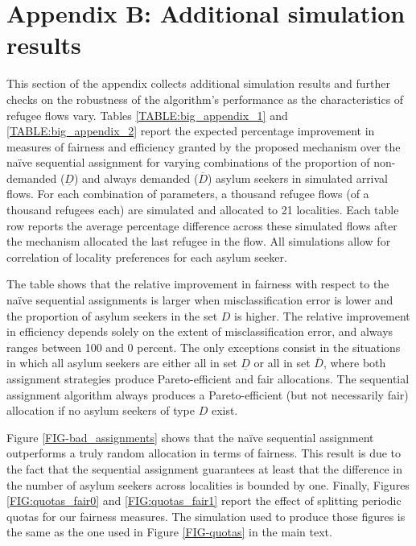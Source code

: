 \documentclass[12pt,fleqn]{article}
\begin{document}
\section*{Appendix B: Additional simulation results}

This section of the appendix collects additional simulation results and further checks on the robustness of the algorithm's performance as the characteristics of refugee flows vary. Tables \ref{TABLE:big_appendix_1} and \ref{TABLE:big_appendix_2} report the expected percentage improvement in measures of fairness and efficiency granted by the proposed mechanism over the na\"{i}ve sequential assignment for varying combinations of the proportion of non-demanded ($\underline{D}$) and always demanded ($\overline{D}$) asylum seekers in simulated arrival flows. For each combination of parameters, a thousand refugee flows (of a thousand refugees each) are simulated and allocated to 21 localities. Each table row reports the average percentage difference across these simulated flows after the mechanism allocated the last refugee in the flow. All simulations allow for correlation of locality preferences for each asylum seeker.

The table shows that the relative improvement in fairness with respect to the na\"{i}ve sequential assignments is larger when misclassification error is lower and the proportion of asylum seekers in the set $D$ is higher. The relative improvement in efficiency depends solely on the extent of misclassification error, and always ranges between 100 and 0 percent. The only exceptions consist in the situations in which all asylum seekers are either all in set $\underline{D}$ or all in set $\overline{D}$, where both assignment strategies produce Pareto-efficient and fair allocations. The sequential assignment algorithm always produces a Pareto-efficient (but not necessarily fair) allocation if no asylum seekers of type $D$ exist.

Figure \ref{FIG-bad_assignments} shows that the na\"{i}ve sequential assignment outperforms a truly random allocation in terms of fairness. This result is due to the fact that the sequential assignment guarantees at least that the difference in the number of asylum seekers across localities is bounded by one. Finally, Figures \ref{FIG:quotas_fair0} and \ref{FIG:quotas_fair1} report the effect of splitting periodic quotas for our fairness measures. The simulation used to produce those figures is the same as the one used in Figure \ref{FIG-quotas} in the main text.
\end{document}
